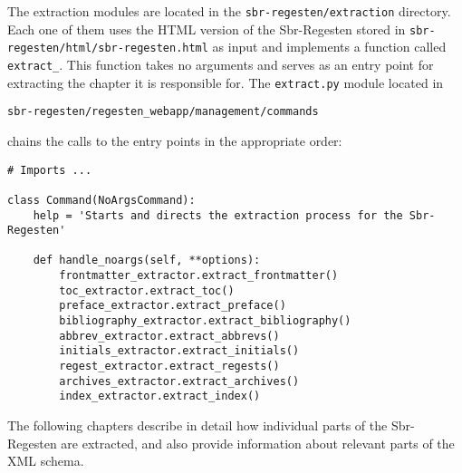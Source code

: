 The extraction modules are located in the
\texttt{sbr-regesten/extraction} directory. Each one of them uses the
HTML version of the Sbr-Regesten stored in
\texttt{sbr-regesten/html/sbr-regesten.html} as input and implements a
function called \texttt{extract\_<part-of-book>}. This function takes
no arguments and serves as an entry point for extracting the chapter
it is responsible for. The \texttt{extract.py} module located in

\begin{verbatim}
sbr-regesten/regesten_webapp/management/commands
\end{verbatim}

chains the calls to the entry points in the appropriate order:

\begin{verbatim}
# Imports ...

class Command(NoArgsCommand):
    help = 'Starts and directs the extraction process for the Sbr-Regesten'

    def handle_noargs(self, **options):
        frontmatter_extractor.extract_frontmatter()
        toc_extractor.extract_toc()
        preface_extractor.extract_preface()
        bibliography_extractor.extract_bibliography()
        abbrev_extractor.extract_abbrevs()
        initials_extractor.extract_initials()
        regest_extractor.extract_regests()
        archives_extractor.extract_archives()
        index_extractor.extract_index()
\end{verbatim}

The following chapters describe in detail how individual parts of the
Sbr-Regesten are extracted, and also provide information about
relevant parts of the XML schema.

